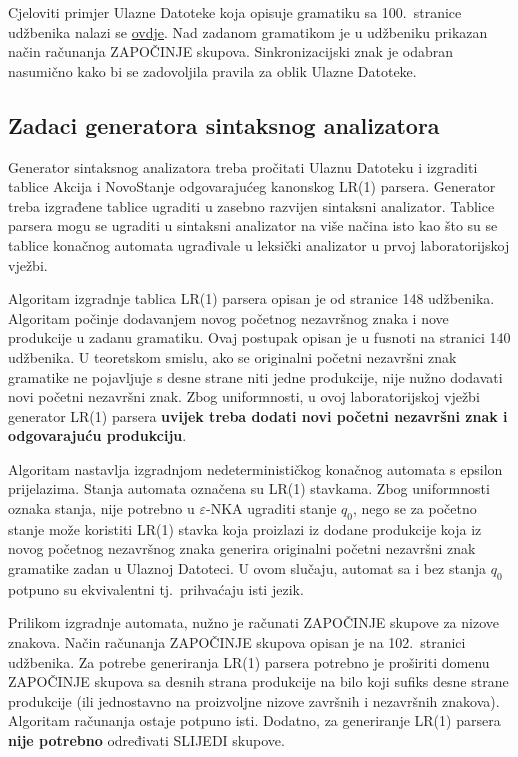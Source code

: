 \documentclass[times, 12pt, utf8]{book}
\begin{document}
Cjeloviti primjer Ulazne Datoteke koja opisuje gramatiku sa 100.~stranice udžbenika nalazi se \href{https://github.com/fer-ppj/ppj-labosi/raw/master/res/lab2/gramatika100.san}{ovdje}.
Nad zadanom gramatikom je u udžbeniku prikazan način računanja ZAPOČINJE skupova.
Sinkronizacijski znak je odabran nasumično kako bi se zadovoljila pravila za oblik Ulazne Datoteke.

\subsection{Zadaci generatora sintaksnog analizatora}
Generator sintaksnog analizatora treba pročitati Ulaznu Datoteku i izgraditi tablice Akcija i NovoStanje odgovarajućeg kanonskog LR(1) parsera.
Generator treba izgrađene tablice ugraditi u zasebno razvijen sintaksni analizator.
Tablice parsera mogu se ugraditi u sintaksni analizator na više načina isto kao što su se tablice konačnog automata ugrađivale u leksički analizator u prvoj laboratorijskoj vježbi.

Algoritam izgradnje tablica LR(1) parsera opisan je od stranice 148 udžbenika.
Algoritam počinje dodavanjem novog početnog nezavršnog znaka i nove produkcije u zadanu gramatiku.
Ovaj postupak opisan je u fusnoti na stranici 140 udžbenika.
U teoretskom smislu, ako se originalni početni nezavršni znak gramatike ne pojavljuje s desne strane niti jedne produkcije, nije nužno dodavati novi početni nezavršni znak.
Zbog uniformnosti, u ovoj laboratorijskoj vježbi generator LR(1) parsera \textbf{uvijek treba dodati novi početni nezavršni znak i odgovarajuću produkciju}.

Algoritam nastavlja izgradnjom nedeterminističkog konačnog automata s epsilon prijelazima.
Stanja automata označena su LR(1) stavkama.
Zbog uniformnosti oznaka stanja, nije potrebno u $\varepsilon$-NKA ugraditi stanje $q_{0}$, nego se za početno stanje može koristiti LR(1) stavka koja proizlazi iz dodane produkcije koja iz novog početnog nezavršnog znaka generira originalni početni nezavršni znak gramatike zadan u Ulaznoj Datoteci.
U ovom slučaju, automat sa i bez stanja $q_{0}$ potpuno su ekvivalentni tj.~prihvaćaju isti jezik.

Prilikom izgradnje automata, nužno je računati ZAPOČINJE skupove za nizove znakova.
Način računanja ZAPOČINJE skupova opisan je na 102.~stranici udžbenika.
Za potrebe generiranja LR(1) parsera potrebno je proširiti domenu ZAPOČINJE skupova sa desnih strana produkcije na bilo koji sufiks desne strane produkcije (ili jednostavno na proizvoljne nizove završnih i nezavršnih znakova).
Algoritam računanja ostaje potpuno isti.
Dodatno, za generiranje LR(1) parsera \textbf{nije potrebno} određivati SLIJEDI skupove.
\end{document}
